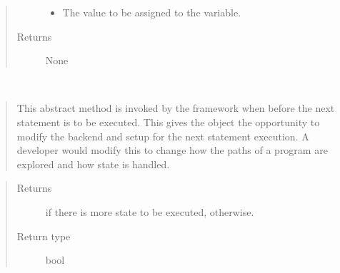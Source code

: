 \documentclass[letterpaper,10pt,english]{sphinxmanual}
\begin{document}
\begin{fulllineitems}
\begin{fulllineitems}
\begin{quote}
\begin{description}
\begin{itemize}
\item {} 
\sphinxAtStartPar
{} \textendash{} The value to be assigned to the variable.

\end{itemize}

\item[{Returns}] \leavevmode
\sphinxAtStartPar
None

\end{description}\end{quote}

\end{fulllineitems}


\begin{fulllineitems}
\label{\detokenize{index:State.State.update_state}}~\begin{quote}

\sphinxAtStartPar
This abstract method is invoked by the framework when before the next
statement is to be executed. This gives the  object the opportunity
to modify the backend and setup for the next
statement execution. A developer would modify this to change
how the paths of a program are explored and how state is handled.
\end{quote}
\begin{quote}\begin{description}
\item[{Returns}] \leavevmode
\sphinxAtStartPar
{} if there is more state to be executed,  otherwise.

\item[{Return type}] \leavevmode
\sphinxAtStartPar
bool

\end{description}\end{quote}

\end{fulllineitems}


\end{fulllineitems}

\label{\detokenize{index:module-Wrappers}}
\end{document}

